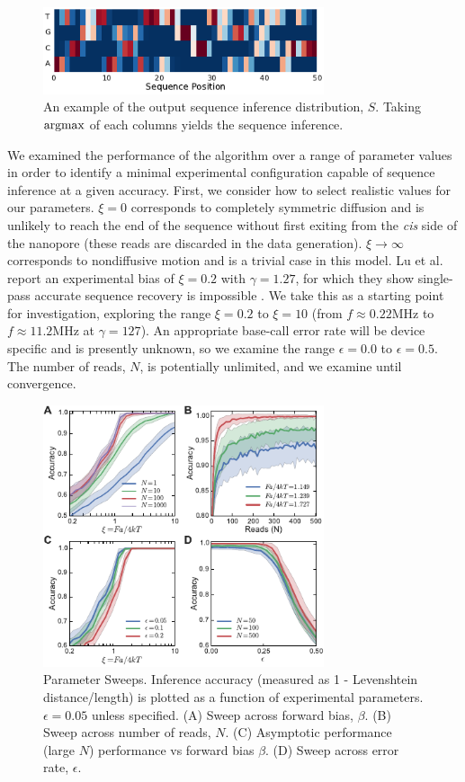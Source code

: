 \documentclass{biophys_letter}
\newcommand{\argmax}{\operatornamewithlimits{argmax}}
\newcommand{\mhz}{\si{\mega\hertz}}
\newcommand{\bias}{\beta}
\newcommand{\err}{\epsilon}
\begin{document}
\begin{figure}
  \centering
  \includegraphics[width=3.25in]{fig/fig2_new.pdf}
  \caption{An example of the output sequence inference distribution, $S$. Taking $\argmax$ of each columns yields the sequence inference.}
  \label{fig:inference_output}
\end{figure}

We examined the performance of the algorithm over a range of parameter values in order to identify a minimal experimental configuration capable of sequence inference at a given accuracy.
First, we consider how to select realistic values for our parameters.
$\xi=0$ corresponds to completely symmetric diffusion and is unlikely to reach the end of the sequence without first exiting from the {\it cis} side of the nanopore (these reads are discarded in the data generation).
$\xi\rightarrow\infty$ corresponds to nondiffusive motion and is a trivial case in this model.
Lu et al. report an experimental bias of $\xi=0.2$ with $\gamma=1.27$, for which they show single-pass accurate sequence recovery is impossible \cite{Lu:2011}.
We take this as a starting point for investigation, exploring the range $\xi=0.2$ to $\xi=10$ (from $f\approx 0.22\mhz$ to $f\approx 11.2\mhz$ at $\gamma=127$).
An appropriate base-call error rate will be device specific and is presently unknown, so we examine the range $\err=0.0$ to $\err=0.5$.
The number of reads, $N$, is potentially unlimited, and we examine until convergence.

\begin{figure}
  \centering
  \includegraphics[width=3.25in]{fig/fig3_new.pdf}
  \caption{Parameter Sweeps. Inference accuracy (measured as 1 - Levenshtein distance/length) is plotted as a function of experimental parameters. $\epsilon=0.05$ unless specified. (A) Sweep across forward bias, $\beta$. (B) Sweep across number of reads, $N$. (C) Asymptotic performance (large $N$) performance vs forward bias $\bias$. (D) Sweep across error rate, $\epsilon$.}
  \label{fig:parameter_sweeps}
\end{figure}
\end{document}
